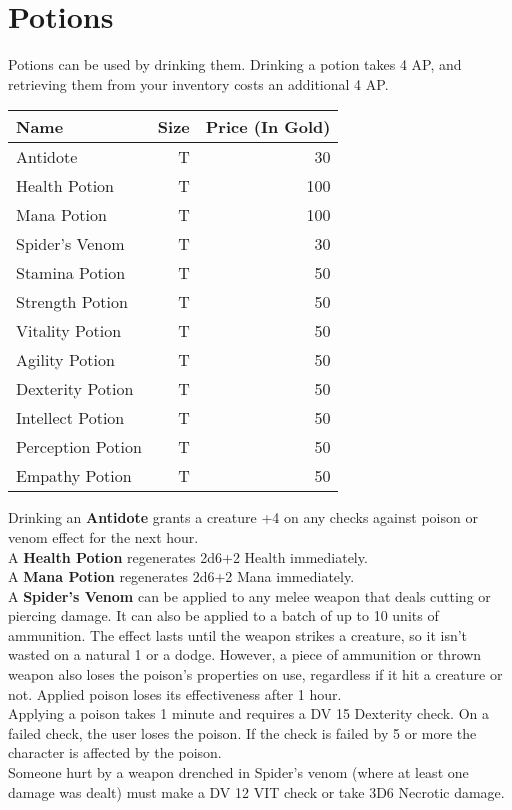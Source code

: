 \section{Potions}\label{sec:potions}
Potions can be used by drinking them.
Drinking a potion takes 4 AP, and retrieving them from your inventory costs an additional 4 AP.

\begin{longtable}{l | r | r}
	Name & Size & Price (In Gold)\\ \hline
	Antidote & T & 30\\
	Health Potion & T & 100\\
	Mana Potion & T & 100\\
	Spider's Venom & T & 30\\
	Stamina Potion & T & 50\\
	Strength Potion & T & 50\\
	Vitality Potion & T & 50\\
	Agility Potion & T & 50\\
	Dexterity Potion & T & 50\\
	Intellect Potion & T & 50\\
	Perception Potion & T & 50\\
	Empathy Potion & T & 50\\
\end{longtable}


Drinking an \textbf{Antidote} grants a creature +4 on any checks against poison or venom effect for the next hour.\\

A \textbf{Health Potion} regenerates 2d6+2 Health immediately.\\

A \textbf{Mana Potion} regenerates 2d6+2 Mana immediately.\\

A \textbf{Spider's Venom} can be applied to any melee weapon that deals cutting or piercing damage.
It can also be applied to a batch of up to 10 units of ammunition.
The effect lasts until the weapon strikes a creature, so it isn't wasted on a natural 1 or a dodge.
However, a piece of ammunition or thrown weapon also loses the poison's properties on use, regardless if it hit a creature or not.
Applied poison loses its effectiveness after 1 hour.\\
Applying a poison takes 1 minute and requires a DV 15 Dexterity check.
On a failed check, the user loses the poison.
If the check is failed by 5 or more the character is affected by the poison.\\
Someone hurt by a weapon drenched in Spider's venom (where at least one damage was dealt) must make a DV 12 VIT check or take 3D6 Necrotic damage.\\

